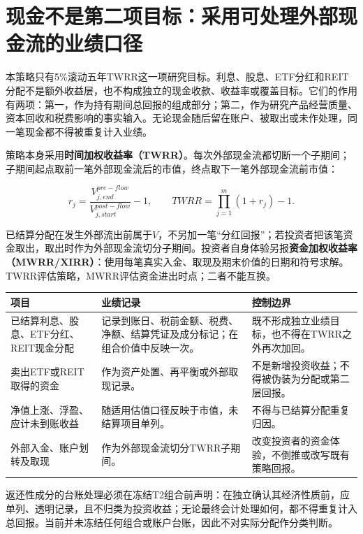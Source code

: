 \section{现金不是第二项目标：采用可处理外部现金流的业绩口径}

本策略只有5\%滚动五年TWRR这一项研究目标。利息、股息、ETF分红和REIT分配不是额外收益层，也不构成独立的现金收款、收益率或覆盖目标。它们的作用有两项：第一，作为持有期间总回报的组成部分；第二，作为研究产品经营质量、资本回收和税费影响的事实输入。无论现金随后留在账户、被取出或未作处理，同一笔现金都不得被重复计入业绩。

策略本身采用\textbf{时间加权收益率（TWRR）}。每次外部现金流都切断一个子期间；子期间起点取前一笔外部现金流后的市值，终点取下一笔外部现金流前市值：

\[
r_j=\frac{V^{pre-flow}_{j,end}}{V^{post-flow}_{j,start}}-1,\qquad
TWRR=\prod_{j=1}^{m}(1+r_j)-1.
\]

已结算分配在发生外部流出前属于\(V\)，不另加一笔“分红回报”；若投资者把该笔资金取出，取出时作为外部现金流切分子期间。投资者自身体验另报\textbf{资金加权收益率（MWRR/XIRR）}：使用每笔真实入金、取现及期末价值的日期和符号求解。TWRR评估策略，MWRR评估资金进出时点；二者不能互换。

\begin{exhibitbox}
\small
\begin{tabularx}{\exhibitboxwidth}{L{3.4cm}P P}
\toprule
\textbf{项目} & \textbf{业绩记录} & \textbf{控制边界} \\
\midrule
已结算利息、股息、ETF分红、REIT现金分配 & 记录到账日、税前金额、税费、净额、结算凭证及成分标记；在组合价值中反映一次。 & 既不形成独立业绩目标，也不得在TWRR之外再次加回。 \\
卖出ETF或REIT取得的资金 & 作为资产处置、再平衡或外部取现记录。 & 不是新增投资收益；不得被伪装为分配或第二层回报。 \\
净值上涨、浮盈、应计未到账收益 & 随适用估值口径反映于市值，未结算项目单列。 & 不得与已结算分配重复归因。 \\
外部入金、账户划转及取现 & 作为外部现金流切分TWRR子期间。 & 改变投资者的资金体验，不倒推或改写既有策略回报。 \\
\bottomrule
\end{tabularx}
\end{exhibitbox}

返还性成分的台账处理必须在冻结T2组合前声明：在独立确认其经济性质前，应单列、透明记录，且不归类为投资收益；无论最终会计处理如何，都不得重复计入总回报。当前并未冻结任何组合或账户台账，因此不对实际分配作分类判断。

